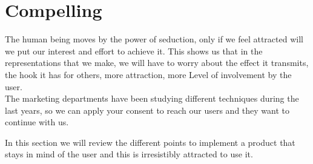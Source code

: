 \newpage
\section{Compelling}
The human being moves by the power of seduction, only if we feel attracted will we put our
interest and effort to achieve it. This shows us that in the representations that we make, we will have to
worry about the effect it transmits, the hook it has for others, more attraction, more
Level of involvement by the user. \\

The marketing departments have been studying different techniques during the last years,
so we can apply your consent to reach our users and they want to continue with us.

In this section we will review the different points to implement a product that stays in mind
of the user and this is irresistibly attracted to use it.

%




